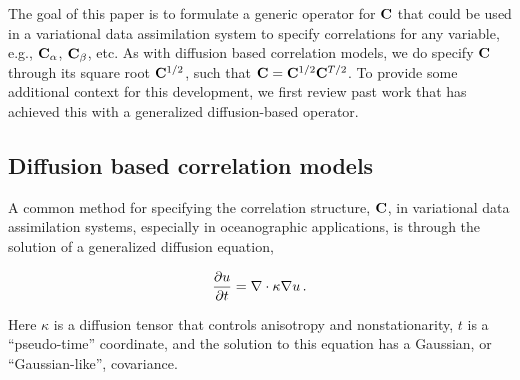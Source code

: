 The goal of this paper is to formulate a generic operator for $\mathbf{C}$
that could be
used in a variational data assimilation system to specify
correlations for any variable, e.g., $\mathbf{C}_\alpha$, $\mathbf{C}_\beta$, etc.
As with diffusion based correlation models, we do specify $\mathbf{C}$ through its
square root $\mathbf{C}^{1/2}$, such that
$\mathbf{C} = \mathbf{C}^{1/2}\mathbf{C}^{T/2}$.
To provide some additional context for this development,
we first review past work that has achieved this with a generalized
diffusion-based operator.


\subsection{Diffusion based correlation models}
\label{ssec:wc01_review}

A common method for specifying the correlation structure,
$\mathbf{C}$, in variational data assimilation systems, especially in
oceanographic applications, is through the solution of a generalized diffusion
equation,
\begin{linenomath*}\begin{equation}
    \dfrac{\partial u}{\partial t} = \nabla \cdot \kappa \nabla u \, .
    \label{eq:diffusion}
\end{equation}\end{linenomath*}
Here $\kappa$ is a diffusion tensor that controls anisotropy and
nonstationarity, $t$ is a ``pseudo-time'' coordinate, and the solution to this
equation has a Gaussian, or ``Gaussian-like'', covariance.

